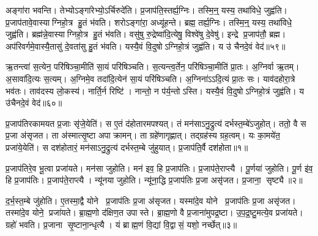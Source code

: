 अङ्गा॑रा भवन्ति।
तेभ्योऽङ्गा॑रेभ्यो॒ऽर्चिरुदे॑ति।
प्र॒जा\-प॑ति॒\-स्तर्ह्य॒ग्निः।
तस्मि॒न्॒ यस्य॒ तथा॑विधे॒ जुह्व॑ति।
प्र॒जाप॑तावे॒वास्याग्निहो॒त्र हु॒तं भ॑वति।
शरोऽङ्गा॑रा॒ अध्यू॑हन्ते।
ब्रह्म॒ तर्ह्य॒ग्निः।
तस्मि॒न्॒ यस्य॒ तथा॑विधे॒ जुह्व॑ति।
ब्रह्म॑न्ने॒वास्याग्निहो॒त्र हु॒तं भ॑वति।
वसु॑षु रु॒द्रेष्वा॑दि॒त्येषु॒ विश्वे॑षु दे॒वेषु॑।
इन्द्रे प्र॒जाप॑तौ॒ ब्रह्म\sn{}।
अप॑रिवर्गमे॒वास्यै॒तासु॑ दे॒वता॑सु हु॒तं भ॑वति।
यस्यै॒वं वि॒दुषोऽग्निहो॒त्रं जुह्व॑ति।
य उ॑ चैनदे॒वं वेद॑॥५९॥\anuvakamend[आ॒दि॒त्यास्तर्ह्य॒ग्निरिन्द्र॑ ए॒वास्याग्निहो॒त्र हु॒तं भ॑वति दे॒वेषु॑ च॒त्वारि॑ च (यद॒ग्निन्निहि॑तः प्रथ॒म सर्व॑ ए॒व नि॑त॒रामङ्गा॑रा॒ शरोऽङ्गा॑रा॒ ब्रह्म॒ वसु॑ष्व॒ष्टौ ॥ )]

ऋ॒तन्त्वा॑ स॒त्येन॒ परि॑षिञ्चा॒मीति॑ सा॒यं परि॑षिञ्चति।
स॒त्यन्त्व॒र्तेन॒ परि॑षिञ्चा॒मीति॑ प्रा॒तः।
अ॒ग्निर्वा ऋ॒तम्।
अ॒सावा॑दि॒त्यः स॒त्यम्।
अ॒ग्निमे॒व तदा॑दि॒त्येन॑ सा॒यं परि॑षिञ्चति।
अ॒ग्निना॑ऽऽदि॒त्यं प्रा॒तः सः।
याव॑दहोरा॒त्रे भव॑तः।
ताव॑दस्य लो॒कस्य॑।
नार्ति॒र्न रिष्टि॑।
नान्तो॒ न प॑र्य॒न्तोऽस्ति।
यस्यै॒वं वि॒दुषोऽग्निहो॒त्रं जुह्व॑ति।
य उ॑चैनदे॒वं वेद॑॥६०॥\anuvakamend[अ॒स्ति॒ द्वे च॑]




\clearpage
{}
\setcounter{anuvakam}{0}

प्र॒जाप॑तिरकामयत प्र॒जाः सृ॑जे॒येति॑।
स ए॒तं द॑होतारम\-पश्यत्।
तं मन॑साऽनु॒द्रुत्य॑ दर्भस्त॒म्बे॑ऽजुहोत्।
ततो॒ वै स प्र॒जा अ॑सृजत।
ता अ॑स्मात्सृ॒ष्टा अपाक्रामन्।
ता ग्रहे॑णागृह्णात्।
तद्ग्रह॑स्य ग्रह॒त्वम्।
यः का॒मये॑त॒ प्रजा॑ये॒येति॑।
स दश॑होतारं॒ मन॑साऽनु॒द्रुत्य॑ दर्भस्त॒म्बे जु॑हुयात्।
प्र॒जाप॑ति॒र्वै दश॑होता॥१॥

प्र॒जाप॑तिरे॒व भू॒त्वा प्रजा॑यते।
मन॑सा जुहोति।
मन॑ इव॒ हि प्र॒जाप॑तिः।
प्र॒जाप॑ते॒राप्त्यै।
पू॒र्णया॑ जुहोति।
पू॒र्ण इ॑व॒ हि प्र॒जाप॑तिः।
प्र॒जाप॑ते॒राप्त्यै।
न्यू॑नया जुहोति।
न्यू॑ना॒द्धि प्र॒जाप॑तिः प्र॒जा असृ॑जत।
प्र॒जाना॒ सृष्ट्यै॥२॥

द॒र्भ॒स्त॒म्बे जु॑होति।
ए॒तस्मा॒द्वै योने प्र॒जाप॑तिः प्र॒जा अ॑सृजत।
यस्मा॑दे॒व योने प्र॒जाप॑तिः प्र॒जा असृ॑जत।
तस्मा॑दे॒व योने॒ प्रजा॑यते।
ब्रा॒ह्म॒णो द॑क्षिण॒त उपास्ते।
ब्रा॒ह्म॒णो वै प्र॒जाना॑मुपद्र॒ष्टा।
उ॒प॒द्र॒ष्टु॒मत्ये॒व प्रजा॑यते।
ग्रहो॑ भवति।
प्र॒जाना सृ॒ष्टाना॒न्धृत्यै।
यं ब्राह्म॒णं वि॒द्यां वि॒द्वासं॒ यशो॒ नर्च्छेत्॥३॥

